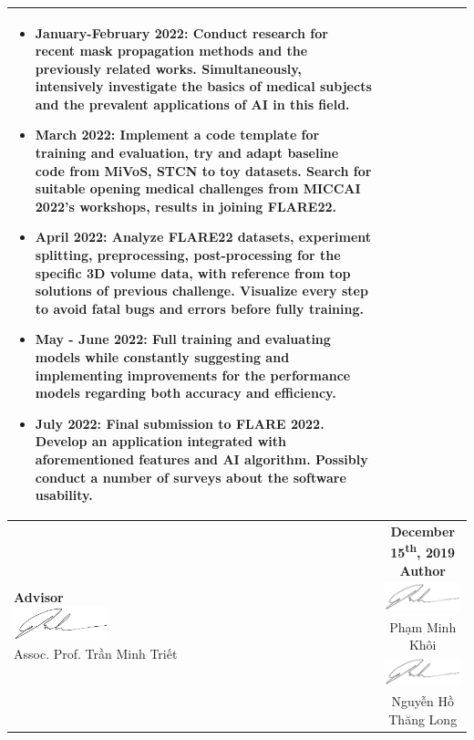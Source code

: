 \begin{longtable}{|p{{{80mm}}}|c|}
{\begin{itemize}
\item \textbf{January-February 2022}: Conduct research for recent mask propagation methods and the previously related works. Simultaneously, intensively investigate the basics of medical subjects and the prevalent applications of AI in this field.
\item \textbf{March 2022}: Implement a code template for training and evaluation, try and adapt baseline code from MiVoS, STCN to toy datasets. Search for suitable opening medical challenges from MICCAI 2022’s workshops, results in joining FLARE22.
\item \textbf{April 2022}: Analyze FLARE22 datasets, experiment splitting, preprocessing, post-processing for the specific 3D volume data, with reference from top solutions of previous challenge. Visualize every step to avoid fatal bugs and errors before fully training.
\item \textbf{May - June 2022}: Full training and evaluating models while constantly suggesting and implementing improvements for the performance models regarding both accuracy and efficiency.
\item \textbf{July 2022}: Final submission to FLARE 2022. Develop an application integrated with aforementioned features and AI algorithm. Possibly conduct a number of surveys about the software usability.
\end{itemize}


}\\
\hline

\makecell[c]{\textbf{Advisor} \\ 
\includegraphics[height=1cm]{resources/signatures/pmkhoi.png} \\ Assoc. Prof. Trần Minh Triết } & 

\makecell[c]{\textbf{December 15\textsuperscript{th}, 2019}\\ \textbf{Author} \\ 
\includegraphics[height=1cm]{resources/signatures/pmkhoi.png} \\ Phạm Minh Khôi \\ 
\includegraphics[height=1cm]{resources/signatures/nhtlong.png} \\ Nguyễn Hồ Thăng Long} \\ 
\hline
\end{longtable}


